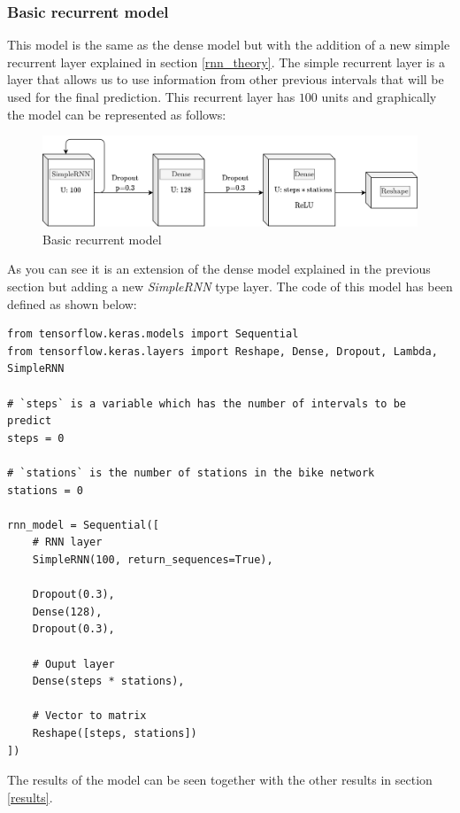 \subsubsection{Basic recurrent model}

This model is the same as the dense model but with the addition of a new simple recurrent layer explained in section \ref{rnn_theory}. The simple recurrent layer is a layer that allows us to use information from other previous intervals that will be used for the final prediction. This recurrent layer has $100$ units and graphically the model can be represented as follows:

\begin{figure}[H]
    \centering
    \includegraphics[width=12cm]{images/solution/models/simpleRnn.png}
    \caption{Basic recurrent model}
    \label{fig:dense-model}
\end{figure}

As you can see it is an extension of the dense model explained in the previous section but adding a new \textit{SimpleRNN} type layer. The code of this model has been defined as shown below:

\begin{verbatim}
from tensorflow.keras.models import Sequential
from tensorflow.keras.layers import Reshape, Dense, Dropout, Lambda, SimpleRNN

# `steps` is a variable which has the number of intervals to be predict
steps = 0 

# `stations` is the number of stations in the bike network
stations = 0

rnn_model = Sequential([
    # RNN layer
    SimpleRNN(100, return_sequences=True),
    
    Dropout(0.3),
    Dense(128),
    Dropout(0.3),
    
    # Ouput layer
    Dense(steps * stations),
    
    # Vector to matrix
    Reshape([steps, stations])
])
\end{verbatim}

The results of the model can be seen together with the other results in section \ref{results}.